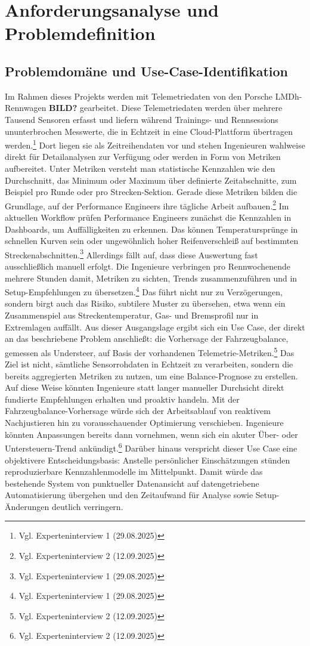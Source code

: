 \chapter{Anforderungsanalyse und Problemdefinition}
\section{Problemdomäne und Use-Case-Identifikation}

Im Rahmen dieses Projekts werden mit Telemetriedaten von den Porsche LMDh-Rennwagen \textbf{BILD?} gearbeitet. Diese Telemetriedaten werden über mehrere Tausend Sensoren erfasst und liefern während Trainings- und Rennsessions ununterbrochen Messwerte, die in Echtzeit in eine Cloud-Plattform übertragen werden.\footnote{Vgl. Experteninterview 1 (29.08.2025)} Dort liegen sie als Zeitreihendaten vor und stehen Ingenieuren wahlweise direkt für Detailanalysen zur Verfügung oder werden in Form von Metriken aufbereitet. Unter Metriken versteht man statistische Kennzahlen wie den Durchschnitt, das Minimum oder Maximum über definierte Zeitabschnitte, zum Beispiel pro Runde oder pro Strecken-Sektion. Gerade diese Metriken bilden die Grundlage, auf der Performance Engineers ihre tägliche Arbeit aufbauen.\footnote{Vgl. Experteninterview 2 (12.09.2025)}
Im aktuellen Workflow prüfen Performance Engineers zunächst die Kennzahlen in Dashboards, um Auffälligkeiten zu erkennen. Das können Temperatursprünge in schnellen Kurven sein oder ungewöhnlich hoher Reifenverschleiß auf bestimmten Streckenabschnitten.\footnote{Vgl. Experteninterview 1 (29.08.2025)} Allerdings fällt auf, dass diese Auswertung fast ausschließlich manuell erfolgt. Die Ingenieure verbringen pro Rennwochenende mehrere Stunden damit, Metriken zu sichten, Trends zusammenzuführen und in Setup-Empfehlungen zu übersetzen.\footnote{Vgl. Experteninterview 1 (29.08.2025)} Das führt nicht nur zu Verzögerungen, sondern birgt auch das Risiko, subtilere Muster zu übersehen, etwa wenn ein Zusammenspiel aus Streckentemperatur, Gas- und Bremsprofil nur in Extremlagen auffällt.
Aus dieser Ausgangslage ergibt sich ein Use Case, der direkt an das beschriebene Problem anschließt: die Vorhersage der Fahrzeugbalance, gemessen als Understeer, auf Basis der vorhandenen Telemetrie-Metriken.\footnote{Vgl. Experteninterview 2 (12.09.2025)} Das Ziel ist nicht, sämtliche Sensorrohdaten in Echtzeit zu verarbeiten, sondern die bereits aggregierten Metriken zu nutzen, um eine Balance-Prognose zu erstellen. Auf diese Weise könnten Ingenieure statt langer manueller Durchsicht direkt fundierte Empfehlungen erhalten und proaktiv handeln.
Mit der Fahrzeugbalance-Vorhersage würde sich der Arbeitsablauf von reaktivem Nachjustieren hin zu vorausschauender Optimierung verschieben. Ingenieure könnten Anpassungen bereits dann vornehmen, wenn sich ein akuter Über- oder Untersteuern-Trend ankündigt.\footnote{Vgl. Experteninterview 2 (12.09.2025)} Darüber hinaus verspricht dieser Use Case eine objektivere Entscheidungsbasis: Anstelle persönlicher Einschätzungen stünden reproduzierbare Kennzahlenmodelle im Mittelpunkt. Damit würde das bestehende System von punktueller Datenansicht auf datengetriebene Automatisierung übergehen und den Zeitaufwand für Analyse sowie Setup-Änderungen deutlich verringern.

